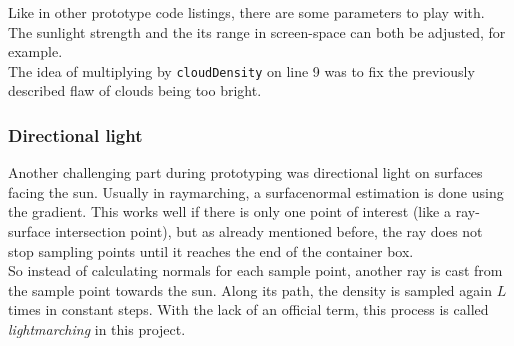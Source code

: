 \noindent
Like in other prototype code listings, there are some \gls{parameters} to play with. The sunlight strength and the its range in screen-space can both be adjusted, for example.
\\
The idea of multiplying by \lstinline[language=HLSL]{cloudDensity} on line 9 was to fix the previously described flaw of clouds being too bright. 

\clearpage
\subsubsection{Directional light}
Another challenging part during prototyping was directional light on surfaces facing the sun. Usually in \gls{raymarching}, a \gls{surfacenormal} estimation is done using the gradient.
This works well if there is only one point of interest (like a ray-surface intersection point), but as already mentioned before, the ray does not stop sampling points until it reaches the end of the container box.
\\
So instead of calculating normals for each sample point, another ray is cast from the sample point towards the sun.
Along its path, the density is sampled again $L$ times in constant steps. With the lack of an official term, this process is called \textit{\gls{lightmarching}} in this project.


